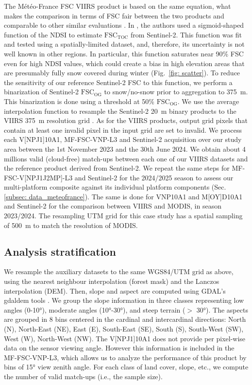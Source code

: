 \documentclass[tc, manuscript]{copernicus}
\begin{document}
The Météo-France FSC VIIRS  product is based on the same equation, what makes the comparison in terms of FSC fair between the two products and comparable to other similar evaluations \citep{masson_assessment_2018}. In \citep{gascoin_estimating_2020}, the authors used a sigmoid-shaped function of the NDSI to estimate $\mathrm{FSC_{TOC}}$ from Sentinel-2. This function was fit and tested using a spatially-limited dataset, and, therefore, its uncertainty is not well known in other regions. In particular, this function saturates near 90\% FSC even for high NDSI values, which could create a bias in high elevation areas that are presumably fully snow covered during winter (Fig.~\ref{fig: scatter}). To reduce the sensitivity of our reference Sentinel-2 FSC to this function, we perform a binarization of Sentinel-2 $\mathrm{FSC_{OG}}$ to snow/no-snow prior to aggregation to 375~m. This binarization is done using a threshold at 50\% $\mathrm{FSC_{OG}}$. We use the average interpolation function to resample the Sentinel-2 20~m binary products to the VIIRS 375~m resolution grid \citep{gdal}. As for the VIIRS products, output grid pixels that contain at least one invalid pixel in the input grid are set to invalid. 
We process each V[NP\textbar J1]10A1, MF-FSC-VNP-L3 and Sentinel-2 acquisition over our study area between the 1st November 2023 and the 30th June 2024. We obtain about 4 millions valid (cloud-free) match-ups between each one of our VIIRS datasets and the reference product derived from Sentinel-2. We repeat the same steps for MF-FSC-V[NP\textbar J1\textbar J2\textbar MP]-L3 and Sentinel-2 for the 2024/2025 season to assess our multi-platform composite against its individual platform components (Sec. \ref{subsec: data_meteofrance}). The same is done for VNP10A1 and M[O\textbar Y]D10A1 and Sentinel-2 for the comparison between VIIRS and MODIS, in season 2023/2024. The resampling UTM grid for this case study has a spatial sampling of 500~m to match the resolution of MODIS.
 
\subsection{Analysis stratification} 
\label{subsec: obs_classes}

We resample the auxiliary datasets to the same WGS84/UTM grid as above, using the nearest neighbour interpolation (forest mask) and the Lanczos interpolation (DEM). Then, slope and aspect are computed using GDAL's gdaldem tools \citep{gdal}. We group the slope information in three classes representing low angles (0-10°), moderate angles (10°-30°), and steep terrain ($>$ 30°). The aspects are grouped in 8 bins centered in the cardinal and intercardinal directions: North (N), North-East (NE), East (E), South-East (SE), South (S), South-West (SW), West (W), North-West (NW). The V[NP\textbar J1]10A1 does not provide per pixel-wise data on the sensor viewing angle. However this information is included in the MF-FSC-VNP-L3, which allows us to analyze the performance of this product by bins of 15° view zenith angle. For each class of land cover, slope, etc., we compute the number of valid match-ups (i.e., the sample size). 
\end{document}
